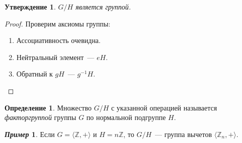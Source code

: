 \documentclass[a4paper, 14pt]{extarticle}
\newcommand{\integers}{\mathbb{Z}}
\theoremstyle{definition}
\newtheorem*{exmpl*}{\textit{Пример}}
\newtheorem{definition}{Определение}
\theoremstyle{plain}
\numberwithin{theorem}{section}
\numberwithin{definition}{section}
\newtheorem*{statement*}{Утверждение}
\numberwithin{statement}{section}
\numberwithin{lemma}{section}
\numberwithin{consequence}{section}
\begin{document}
		\newpage
		\begin{statement*}
			$G/H$ является группой.
		\end{statement*}
		\begin{proof}
			Проверим аксиомы группы:
			\begin{enumerate}
				\setlength\itemsep{0.1em}
				\item Ассоциативность очевидна.
				\item Нейтральный элемент~--- $eH.$
				\item Обратный к $gH$~--- $g^{-1}H.$ \qedhere 
			\end{enumerate}
		\end{proof}
		\begin{definition}
			Множество $G/H$ с указанной операцией называется \textit{факторгруппой} группы $G$ по нормальной подгруппе $H$.
		\end{definition}
		\begin{exmpl*}
			Если $G = \langle \integers, + \rangle$ и $H = n\integers$, то $G/H$~--- группа вычетов $\langle \integers_n, + \rangle.$
		\end{exmpl*}
	\newpage	
\end{document}
